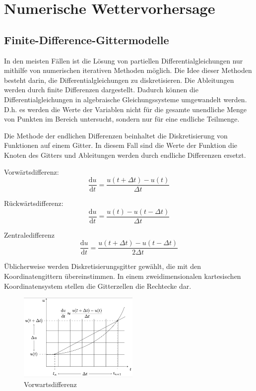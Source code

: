 %
%
%
%
\section{Numerische Wettervorhersage
\label{spektral:section:nwp}}

\subsection{Finite-Difference-Gittermodelle
\label{spektral:subsection:gittermodelle}}
In den meisten Fällen ist die Lösung von partiellen Differentialgleichungen nur mithilfe von numerischen iterativen Methoden möglich. 
Die Idee dieser Methoden besteht darin, die Differentialgleichungen zu diskretisieren.
Die Ableitungen werden durch finite Differenzen dargestellt.
Dadurch können die Differentialgleichungen in algebraische Gleichungssysteme umgewandelt werden.
D.h. es werden die Werte der Variablen nicht für die gesamte unendliche Menge von Punkten im Bereich untersucht, sondern nur für eine endliche Teilmenge.

Die Methode der endlichen Differenzen beinhaltet die Diskretisierung von Funktionen auf einem Gitter.
In diesem Fall sind die Werte der Funktion die Knoten des Gitters und Ableitungen werden durch endliche Differenzen ersetzt.

Vorwärtsdifferenz:
\begin{equation}
\frac{\mathrm{d}u}{\mathrm{d}t} = \frac{u(t + \Delta{t}) - u(t)}{\Delta{t}}
\label{spektral:equation1}
\end{equation}

Rückwärtsdifferenz:
\begin{equation}
\frac{\mathrm{d}u}{\mathrm{d}t} = \frac{u(t) - u(t - \Delta{t})}{\Delta{t}}
\label{spektral:equation2}
\end{equation}

Zentraledifferenz
\begin{equation}
\frac{\mathrm{d}u}{\mathrm{d}t} = \frac{u(t + \Delta{t}) - u(t - \Delta{t})}{2\Delta{t}}
\label{spektral:equation3}
\end{equation}

Üblicherweise werden Diskretisierungsgitter gewählt, die mit den Koordinatengittern übereinstimmen.
In einem zweidimensionalen kartesischen Koordinatensystem stellen die Gitterzellen die Rechtecke dar.
\pagebreak
\begin{figure}[h]
	\centering
	\includegraphics[height=120pt]{papers/spektral/images/forwarddiff.png}
	\caption{Vorwartsdifferenz}
    \label{spektral:fig:gittermodelle}
\end{figure}

